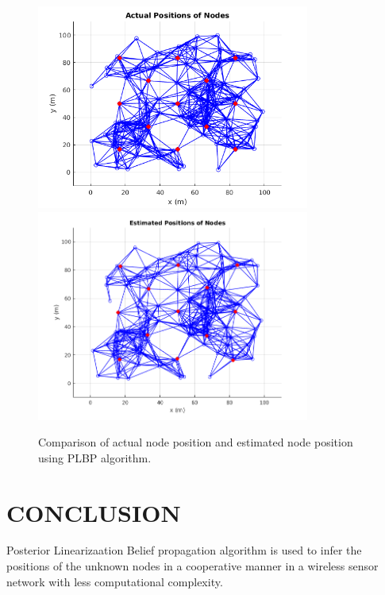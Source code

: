 \documentclass[12pt]{article}
\begin{document}
\begin{figure}
  \centering
{\includegraphics[width=0.8\textwidth]{images/actual.png}}
{\includegraphics[width=0.8\textwidth]{images/est.png}}
\caption{ Comparison of actual node position and estimated node position using PLBP algorithm. }
\end{figure}

\newpage






\section{CONCLUSION}
 Posterior Linearizaation Belief propagation algorithm is used to infer the positions of the unknown nodes in a cooperative manner in a wireless sensor network with less computational complexity.


\newpage
\end{document}
